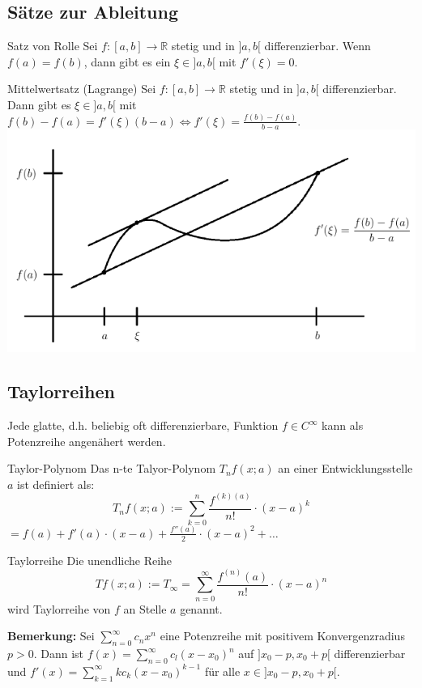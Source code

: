 \documentclass[a4paper,8pt]{extarticle}
\newenvironment{bemerkung}{
   \noindent \textbf{Bemerkung:  }}{}
\def\sumk{\sum_{k=1}^\infty}
\def\sumn{\sum_{n=0}^\infty}
\def\R{\mathbb{R}}
\begin{document}
\subsection{Sätze zur Ableitung}
\begin{subbox}{Satz von Rolle}
 Sei $f: [a,b] \to \R$ stetig und in $]a,b[$ differenzierbar. Wenn $f(a) = f(b)$, dann gibt es ein $\xi \in ]a,b[$ mit $f'(\xi) = 0$.
\end{subbox}
\begin{mainbox}{Mittelwertsatz (Lagrange)}
 Sei $f: [a,b] \to \R$ stetig und in $]a,b[$ differenzierbar. Dann gibt es $\xi \in ]a,b[$ mit $f(b) - f(a) = f'(\xi)(b-a) \Leftrightarrow f'(\xi) = \frac{f(b) - f(a)}{b-a}$.
 \includegraphics[width=\linewidth]{mittelwertsatz.png}
\end{mainbox}


\subsection{Taylorreihen}
Jede glatte, d.h. beliebig oft differenzierbare, Funktion $f \in C^\infty$ kann als Potenzreihe angenähert werden.

\begin{mainbox}{Taylor-Polynom}
 Das n-te Talyor-Polynom $T_n f(x; a)$ an einer Entwicklungsstelle $a$ ist definiert als:
 $$T_n f(x; a) := \sum_{k=0}^{n} \frac{f^{(k) (a)}}{n!} \cdot (x - a)^k$$ 
 $ = f(a) + f'(a) \cdot (x-a) + \frac{f''(a)}{2} \cdot (x - a)^2 + \ldots$
\end{mainbox}

\begin{mainbox}{Taylorreihe}
 Die unendliche Reihe
 $$Tf(x;a) := T_\infty = \sumn \frac{f^(n)(a)}{n!} \cdot (x-a)^n$$
 wird Taylorreihe von $f$ an Stelle $a$ genannt.
\end{mainbox}
\begin{bemerkung}
  Sei $\sumn c_n x^n$ eine Potenzreihe mit positivem Konvergenzradius $p > 0$. Dann ist $f(x) = \sumn c_l(x - x_0)^n$ auf $]x_0 - p, x_0 + p[$ differenzierbar und $f'(x) = \sumk kc_k(x-x_0)^{k-1}$ für alle $x \in ]x_0 - p, x_0 + p[$.
\end{bemerkung}
\end{document}

